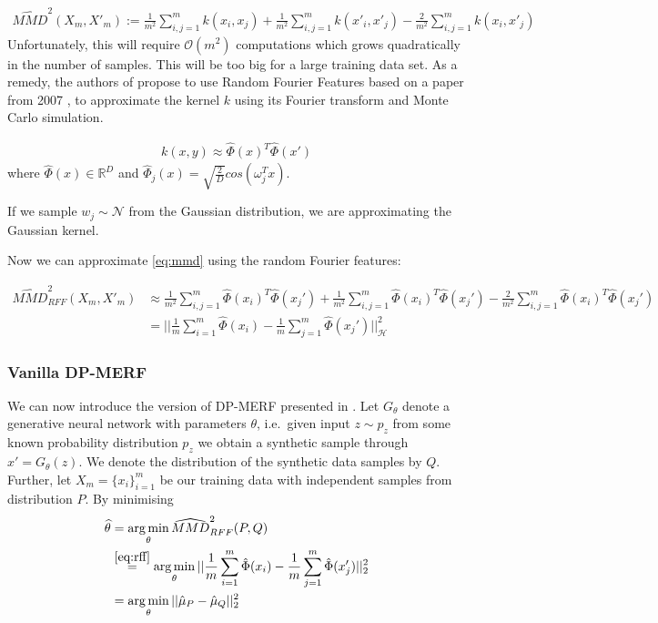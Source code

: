 \begin{align} \label{eq:mmd}
    \widehat{MMD}^2(X_m, X'_m) := \frac{1}{m^2} \sum_{i,j=1}^m k(x_i,x_j) + \frac{1}{m^2} \sum_{i,j=1}^m k(x'_i,x'_j) - \frac{2}{m^2} \sum_{i,j=1}^m k(x_i,x'_j)
\end{align}
Unfortunately, this will require $\mathcal{O}(m^2)$ computations which grows quadratically in the number of samples. This will be too big for a large training data set. As a remedy, the authors of \parencite{dpmerf} propose to use Random Fourier Features based on a paper from 2007 \parencite[see][]{rff}, to approximate the kernel $k$ using its Fourier transform and Monte Carlo simulation.

\begin{align}
    k(x,y) \approx \hat{\Phi}(x)^T \hat{\Phi}(x')
\end{align}
where $\hat{\Phi}(x) \in \mathbb{R}^D$ and $\hat{\Phi}_j(x) = \sqrt{\frac{2}{D}} cos (\omega_j^T x)$.

If we sample $w_j \sim \mathcal{N}$ from the Gaussian distribution, we are approximating the Gaussian kernel.

Now we can approximate \cref{eq:mmd} using the random Fourier features:

\begin{align} \label{eq:rff}
    \widehat{MMD}^2_{RFF}(X_m, X'_m) &\approx \frac{1}{m^2} \sum_{i,j=1}^m \hat{\Phi}(x_i)^T \hat{\Phi}(x_j') + \frac{1}{m^2} \sum_{i,j=1}^m \hat{\Phi}(x_i)^T \hat{\Phi}(x_j') - \frac{2}{m^2} \sum_{i,j=1}^m \hat{\Phi}(x_i)^T \hat{\Phi}(x_j') \nonumber \\
    &= || \frac{1}{m} \sum_{i=1}^m \hat{\Phi}(x_i) - \frac{1}{m} \sum_{j=1}^m \hat{\Phi}(x_j') ||_\mathcal{H}^2
\end{align}


\subsubsection{Vanilla DP-MERF}
We can now introduce the version of DP-MERF presented in \parencite{dpmerf}. Let $G_\theta$ denote a generative neural network with parameters $\theta$, i.e.\ given input $z \sim p_z$ from some known probability distribution $p_z$ we obtain a synthetic sample through $x' = G_\theta(z)$. We denote the distribution of the synthetic data samples by $Q$. Further, let $X_m = \{x_i\}_{i=1}^m$ be our training data with independent samples from  distribution $P$. By minimising 
\begin{align}
    \widehat{\theta} &= \operatorname*{arg\,min}_\theta \widehat{MMD}^2_{RFF}(P, Q) \nonumber \\
    &\overset{\ref{eq:rff}}{=} \operatorname*{arg\,min}_\theta || \frac{1}{m} \sum_{i=1}^m \hat{\Phi}(x_i) - \frac{1}{m} \sum_{j=1}^m \hat{\Phi}(x_j') ||_2^2 \nonumber \\
    &= \operatorname*{arg\,min}_\theta || \hat{\mu}_P - \hat{\mu}_Q ||_2^2
\end{align}

